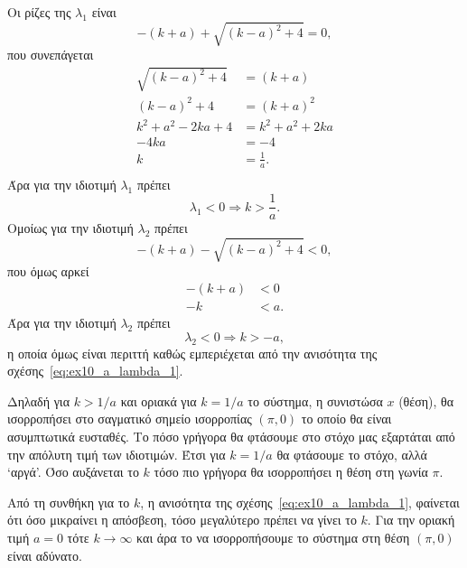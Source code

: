\begin{solution}
    Οι ρίζες της \( \lambda_1 \) είναι
    \[
        -(k + a) + \sqrt{(k -a)^2 + 4} = 0,
    \]
    που συνεπάγεται
    \begin{align*}
         \sqrt{(k -a)^2 + 4} &= (k + a) \\
         (k -a)^2 + 4 &= (k + a)^2 \\
         k^2 + a^2 -2ka + 4 &= k^2 + a^2 + 2ka \\
         -4ka &= -4 \\
         k &= \frac{1}{a}. \\
    \end{align*}
    Άρα για την ιδιοτιμή \( \lambda_1 \) πρέπει
    \begin{equation}\label{eq:ex10_a_lambda_1}
        \lambda_1 < 0 \Rightarrow k > \frac{1}{a}.
    \end{equation}
    Ομοίως για την ιδιοτιμή \( \lambda_2 \) πρέπει
    \[
        -(k + a) - \sqrt{(k -a)^2 + 4} < 0,
    \]
    που όμως αρκεί
    \begin{align*}
        -(k + a) &< 0 \\
        -k &< a.
    \end{align*}
    Άρα για την ιδιοτιμή \( \lambda_2 \) πρέπει
    \[
        \lambda_2 < 0 \Rightarrow k > -a,
    \]
    η οποία όμως είναι περιττή καθώς εμπεριέχεται από την ανισότητα της
    σχέσης~\eqref{eq:ex10_a_lambda_1}.

    Δηλαδή για \( k > 1/a \) και οριακά για \( k = 1/a \) το σύστημα, η
    συνιστώσα \( x \) (θέση), θα ισορροπήσει στο σαγματικό σημείο ισορροπίας
    \( (\pi, 0) \) το οποίο θα είναι ασυμπτωτικά ευσταθές. Το πόσο γρήγορα θα
    φτάσουμε στο στόχο μας εξαρτάται από την απόλυτη τιμή των ιδιοτιμών. Έτσι
    για \( k = 1/a \) θα φτάσουμε το στόχο, αλλά \enquote*{αργά}. Όσο αυξάνεται
    το \( k \) τόσο πιο γρήγορα θα ισορροπήσει η θέση στη γωνία \( \pi \).

    Από τη συνθήκη για το \( k \), η ανισότητα της
    σχέσης~\eqref{eq:ex10_a_lambda_1}, φαίνεται ότι όσο μικραίνει η απόσβεση,
    τόσο μεγαλύτερο πρέπει να γίνει το \( k \). Για την οριακή τιμή \( a = 0 \)
    τότε \( k \to \infty \) και άρα το να ισορροπήσουμε το σύστημα στη θέση \(
    (\pi, 0) \) είναι αδύνατο.


\end{solution}
